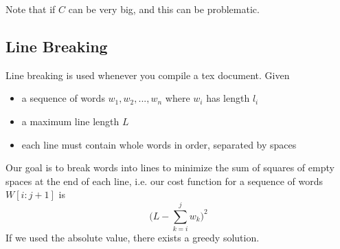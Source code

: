   Note that if $C$ can be very big, and this can be problematic. 

\subsection{Line Breaking}

  \begin{definition}
    \label{def:line-breaking}
    Line breaking is used whenever you compile a tex document. Given 
    \begin{itemize}
      \item a sequence of words $w_1, w_2, ..., w_n$ where $w_i$ has length $l_i$
      \item a maximum line length $L$
      \item each line must contain whole words in order, separated by spaces
    \end{itemize}
    Our goal is to break words into lines to minimize the sum of squares of empty spaces at the end of each line, i.e. our cost function for a sequence of words $W[i:j+1]$ is 
    \begin{equation}
      \bigg( L - \sum_{k=i}^j w_k \bigg)^2
    \end{equation} 
    If we used the absolute value, there exists a greedy solution. 
  \end{definition}

